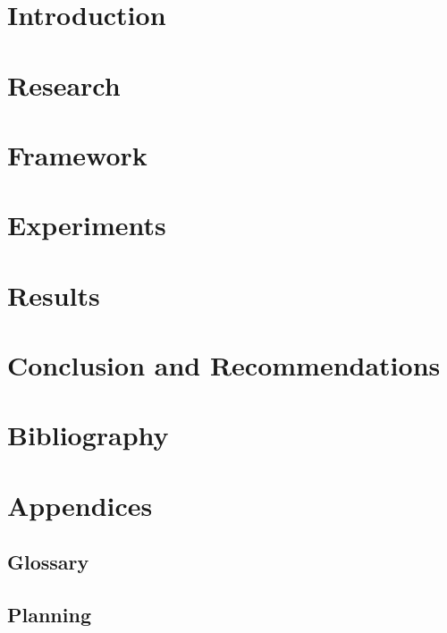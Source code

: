 \documentclass{report}
\begin{document}
\chapter{Introduction}



\chapter{Research}



\chapter{Framework}



\chapter{Experiments}



\chapter{Results}



\chapter{Conclusion and Recommendations}



\chapter{Bibliography}



\appendix
{}
\chapter*{Appendices}
\renewcommand{\thesection}{\Alph{section}}
\section{Glossary}

\section{Planning}

\end{document}
